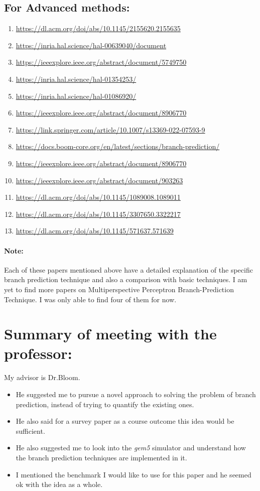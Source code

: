 \documentclass[12pt]{article}
\begin{document}
\subsection*{For Advanced methods: }
\begin{enumerate}
    \item \url{https://dl.acm.org/doi/abs/10.1145/2155620.2155635}
    \item \url{https://inria.hal.science/hal-00639040/document}
    \item \url{https://ieeexplore.ieee.org/abstract/document/5749750}
    \item \url{https://inria.hal.science/hal-01354253/}
    \item \url{https://inria.hal.science/hal-01086920/}
    \item \url{https://ieeexplore.ieee.org/abstract/document/8906770}
    \item \url{https://link.springer.com/article/10.1007/s13369-022-07593-9}
    \item \url{https://docs.boom-core.org/en/latest/sections/branch-prediction/}
    \item \url{https://ieeexplore.ieee.org/abstract/document/8906770}
    \item \url{https://ieeexplore.ieee.org/abstract/document/903263}
    \item \url{https://dl.acm.org/doi/abs/10.1145/1089008.1089011}
    \item \url{https://dl.acm.org/doi/abs/10.1145/3307650.3322217}
    \item \url{https://dl.acm.org/doi/abs/10.1145/571637.571639}
\end{enumerate}
\paragraph*{Note: }
Each of these papers mentioned above have a detailed explanation of the specific branch prediction technique and also a comparison with basic techniques.
I am yet to find more papers on Multiperspective Perceptron Branch-Prediction Technique. I was only able to find four of them for now.
\section*{Summary of meeting with the professor: }
My advisor is Dr.Bloom. 
\begin{itemize}
    \item He suggested me to pursue a novel approach to solving the problem of branch prediction, instead of trying to quantify the existing ones. 
    \item He also said for a survey paper as a course outcome this idea would be sufficient.
    \item He also suggested me to look into the \emph{gem5} simulator and understand how the branch prediction techniques are implemented in it.
    \item I mentioned the benchmark I would like to use for this paper and he seemed ok with the idea as a whole. 
\end{itemize}
\end{document}
